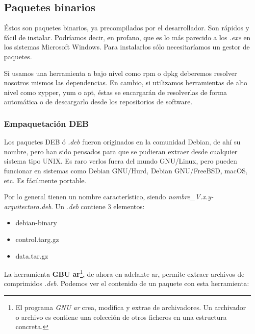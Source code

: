 \documentclass[a4paper, 11pt, titlepage]{article}
\begin{document}
    \subsection{Paquetes binarios}

        Éstos son paquetes binarios, ya precompilados por el desarrollador. Son rápidos y 
        fácil de instalar. Podríamos decir, en profano, que es lo más parecido a los \textit{.exe}
        en los sistemas Microsoft Windows. Para instalarlos sólo necesitaríamos un gestor 
        de paquetes.

        Si usamos una herramienta a bajo nivel como rpm o dpkg deberemos resolver nosotros mismos 
        las dependencias. En cambio, si utilizamos herramientas de alto nivel como zypper, yum o apt,
        éstas se encargarán de resolverlas de forma automática o de descargarlo desde los repositorios 
        de software.

        \subsubsection{Empaquetación DEB}

            Los paquetes DEB ó \textit{.deb} fueron originados en la comunidad Debian, de ahí su nombre, 
            pero han sido pensados para que se pudieran extraer desde cualquier sistema tipo UNIX. Es raro 
            verlos fuera del mundo GNU/Linux, pero pueden funcionar en sistemas como Debian GNU/Hurd, 
            Debian GNU/FreeBSD, macOS, etc. Es fácilmente portable.

            Por lo general tienen un nombre característico, siendo \textit{nombre\_V.x.y-arquitectura.deb}.
            Un \textit{.deb} contiene 3 elementos:

            \begin{itemize}
                \item debian-binary
                \item control.targ.gz
                \item data.tar.gz
            \end{itemize}

            La herramienta \textbf{GBU ar}\footnote{
                El programa \textit{GNU ar} crea, modifica y extrae de archivadores. Un archivador o archivo 
                es contiene una colección de otros ficheros en una estructura concreta.
            }, de ahora en adelante ar, permite extraer archivos de comprimidos \textit{.deb}. Podemos 
            ver el contenido de un paquete con esta herramienta:
\end{document}

